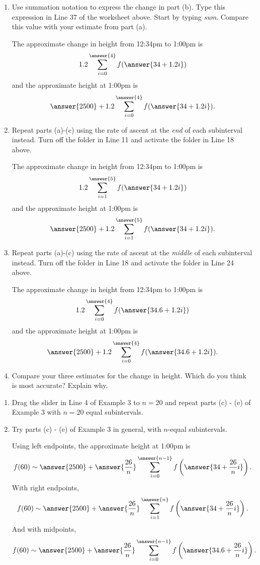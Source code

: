 \documentclass{ximera}
\begin{document}
\begin{example}
\begin{enumerate}
\item Use summation notation to express the change in part (b). Type this expression in Line 37 of the worksheet above. Start by typing \emph{sum}. Compare this value with your estimate from part (a).

The approximate change in height from 12:34pm to 1:00pm is
\[
  1.2 \sum_{i=0}^{\answer{4}} f(\answer{34 + 1.2i})  
\]
and the approximate height at 1:00pm is
\[
     \answer{2500} + 1.2 \sum_{i=0}^{\answer{4}} f(\answer{34 + 1.2i})  .
\]

\item Repeat parts (a)-(c) using the rate of ascent at the \emph{end} of each subinterval instead. Turn off the folder in Line 11 and activate the folder in Line 18 above.

The approximate change in height from 12:34pm to 1:00pm is
\[
  1.2 \sum_{i=1}^{\answer{5}} f(\answer{34 + 1.2i})  
\]
and the approximate height at 1:00pm is
\[
     \answer{2500} + 1.2 \sum_{i=1}^{\answer{5}} f(\answer{34 + 1.2i})  .
\]

\item Repeat parts (a)-(c) using the rate of ascent at the \emph{middle} of each subinterval instead. Turn off the folder in Line 18 and activate the folder in Line 24 above.

The approximate change in height from 12:34pm to 1:00pm is
\[
  1.2 \sum_{i=0}^{\answer{4}} f(\answer{34.6+ 1.2i})  
\]
and the approximate height at 1:00pm is
\[
     \answer{2500} + 1.2 \sum_{i=0}^{\answer{4}} f(\answer{34.6 + 1.2i})  .
\]

\item Compare your three estimates for the change in height. Which do you think is most accurate? Explain why.

\end{enumerate}
\end{example} 

\begin{example}  \label{Ex:IjdRJrehreDF}
\begin{enumerate}
\item  Drag the slider in Line 4 of Example 3 to $n=20$ and repeat parts (c) - (e) of Example 3 with $n=20$ equal subintervals. 

\item Try parts (c) - (e) of Example 3 in general, with $n$-equal subintervals.

Using left endpoints, the approximate height at 1:00pm is
\[
        f(60) \sim   \answer{2500} +  \answer{\frac{26}{n}} \sum_{i=0}^{\answer{n-1}} f\left(\answer{34+ \frac{26}{n}i}\right)  .
\]
With right endpoints,
\[
        f(60) \sim   \answer{2500} +  \answer{\frac{26}{n}} \sum_{i=1}^{\answer{n}} f\left(\answer{34+ \frac{26}{n}i}\right)  .
\]
And with midpoints,
\[
        f(60) \sim   \answer{2500} +  \answer{\frac{26}{n}} \sum_{i=0}^{\answer{n-1}} f\left(\answer{34.6+ \frac{26}{n}i}\right)  .
\]

\end{enumerate}
\end{example}
\end{document}
